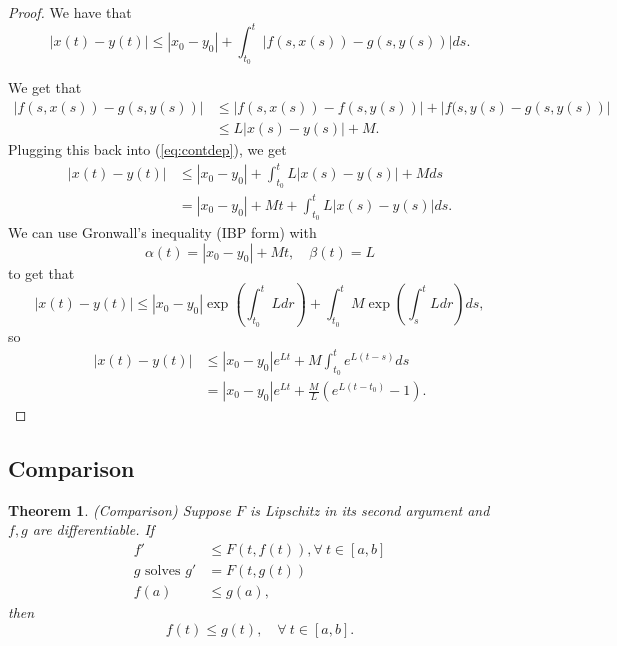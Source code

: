 \documentclass{tufte-handout}
\newtheorem{thm}{Theorem}[subsection]
\theoremstyle{definition}
\begin{document}
\begin{proof}
	We have that
	\begin{equation}
		 \label{eq:contdep}
		\left| x(t) - y(t) \right| \le \left| x_0-y_0 \right|  + \int_{t_0}^{t} \left| f(s,x(s)) - g(s,y(s))  \right|ds 
	.\end{equation}
	
	We get that
	\begin{align*}
		\left| f(s,x(s)) - g(s,y(s)) \right| &\le \left| f(s,x(s)) - f(s,y(s)) \right| + \left| f(s,y(s) - g(s,y(s)) \right| \\
											 &\le L \left| x(s) - y(s) \right| + M
	.\end{align*}
	Plugging this back into (\ref{eq:contdep}), we get
	\begin{align*}
		\left| x(t) - y(t) \right| &\le \left| x_0-y_0 \right| + \int_{t_0}^{t} L \left| x(s) - y(s) \right| + M ds \\
		&= \left| x_0-y_0 \right| + Mt + \int_{t_0}^{t} L \left| x(s) - y(s) \right| ds
	.\end{align*}
	We can use Gronwall's inequality (IBP form) with \[
		\alpha(t) = \left| x_0-y_0 \right| + Mt, \quad \beta(t) = L
	\] to get that \[
		\left| x(t) - y(t) \right| \le \left| x_0-y_0 \right| \operatorname{exp}\left(\int_{t_0}^{t} L dr \right) + \int_{t_0}^{t} M \operatorname{exp}\left(\int_{s}^{t} Ldr \right)ds
	,\] so
	\begin{align*}
		\left| x(t) - y(t) \right|&\le \left| x_0-y_0 \right|e^{Lt} + M \int_{t_0}^{t} e^{L(t-s)}ds \\ 
								  &= \left| x_0-y_0 \right|e^{Lt} + \frac{M}{L} \left(e^{L(t - t_0)}-1\right)
	.\end{align*}
\end{proof}

\subsection{Comparison}

\begin{thm}
	(Comparison) Suppose $F$ is Lipschitz in its second argument and $f,g$ are differentiable. If
	\begin{align}
		f' &\le F(t,f(t)), \forall\ t \in [a,b] \label{comp1}\\
		g \text{ solves } g' &= F(t,g(t)) \label{comp2} \\
		f(a) &\le g(a), \label{comp3}
	\end{align}
	then \[
		f(t) \le g(t), \quad \forall\ t \in [a,b]
	.\]
\end{thm}
\end{document}
